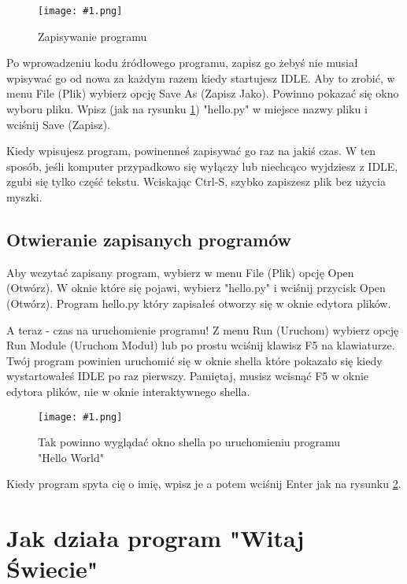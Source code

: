 \documentclass{book}
\newcommand{\img}[3]{
\begin{figure}
\centerline{
	\texttt{[image: \#1.png]}
}
\caption{#2}
\label{#1}
\end{figure}
}
\begin{document}
\img{strings-saveas}{Zapisywanie programu}{7cm}

Po wprowadzeniu kodu źródłowego programu, zapisz go żebyś nie musiał wpisywać go od nowa za każdym razem kiedy startujesz IDLE. Aby to zrobić, w menu File (Plik) wybierz opcję Save As (Zapisz Jako). Powinno pokazać się okno wyboru pliku. Wpisz (jak na rysunku \ref{strings-saveas}) "hello.py" w miejsce nazwy pliku i wciśnij Save (Zapisz).

Kiedy wpisujesz program, powinenneś zapisywać go raz na jakiś czas. W ten sposób, jeśli komputer przypadkowo się wyłączy lub niechcąco wyjdziesz z IDLE, zgubi się tylko część tekstu. Wciskając Ctrl-S, szybko zapiszesz plik bez użycia myszki.


\subsection{Otwieranie zapisanych programów}

Aby wczytać zapisany program, wybierz w menu File (Plik) opcję Open (Otwórz). W oknie które się pojawi, wybierz "hello.py" i wciśnij przycisk Open (Otwórz). Program hello.py który zapisałeś otworzy się w oknie edytora plików.

A teraz - czas na uruchomienie programu! Z menu Run (Uruchom) wybierz opcję Run Module (Uruchom Moduł) lub po prostu wciśnij klawisz F5 na klawiaturze. Twój program powinien uruchomić się w oknie shella które pokazało się kiedy wystartowałeś IDLE po raz pierwszy. Pamiętaj, musisz wcisnąć F5 w oknie edytora plików, nie w oknie interaktywnego shella.

\img{strings-hello}{Tak powinno wyglądać okno shella po uruchomieniu programu "Hello World"}{7cm}

Kiedy program spyta cię o imię, wpisz je a potem wciśnij Enter jak na rysunku \ref{strings-hello}.

\section{Jak działa program "Witaj Świecie"}
\end{document}
